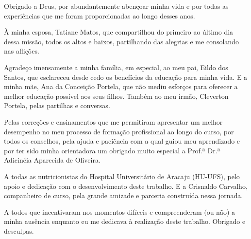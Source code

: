 \begin{agradecimentos}

Obrigado a Deus, por abundantemente abençoar minha vida e por todas as experiências que me foram proporcionadas ao longo desses anos.

À minha esposa, Tatiane Matos, que compartilhou do primeiro ao último dia dessa missão, todos os altos e baixos, partilhando das alegrias e me consolando nas aflições. 

Agradeço imensamente a minha família, em especial, ao meu pai, Eildo dos Santos, que esclareceu desde cedo os benefícios da educação para minha vida. E a minha mãe, Ana da Conceição Portela, que não mediu esforços para oferecer a melhor educação possível aos seus filhos. Também ao meu irmão, Cleverton Portela, pelas partilhas e conversas. 

Pelas correções e ensinamentos que me permitiram apresentar um melhor desempenho no meu processo de formação profissional ao longo do curso, por todos os conselhos, pela ajuda e paciência com a qual guiou meu aprendizado e por ter sido minha orientadora um obrigado muito especial a Prof.ª Dr.ª Adicinéia Aparecida de Oliveira.

A todas as nutricionistas do Hospital Universitário de Aracaju (HU-UFS), pelo apoio e dedicação com o desenvolvimento deste trabalho. E a Crisnaldo Carvalho, companheiro de curso, pela grande amizade e parceria construída nessa jornada.

A todos que incentivaram nos momentos difíceis e compreenderam (ou não) a minha ausência enquanto eu me dedicava à realização deste trabalho. Obrigado e desculpas.

\end{agradecimentos}
